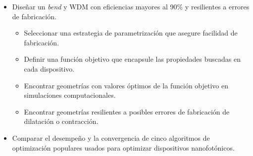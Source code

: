 \begin{itemize}

  \item Diseñar un \emph{bend} y WDM con eficiencias mayores al 90\% y resilientes a errores de fabricación.

  \begin{itemize}

    \item Seleccionar una estrategia de parametrización que asegure facilidad de fabricación.

    \item Definir una función objetivo que encapsule las propiedades buscadas en cada dispositivo.

    \item Encontrar geometrías con valores óptimos de la función objetivo en simulaciones computacionales.

    \item Encontrar geometrías resilientes a posibles errores de fabricación de dilatación o contracción.

  \end{itemize}

  \item Comparar el desempeño y la convergencia de cinco algoritmos de optimización populares usados para optimizar dispositivos nanofotónicos.

\end{itemize}
